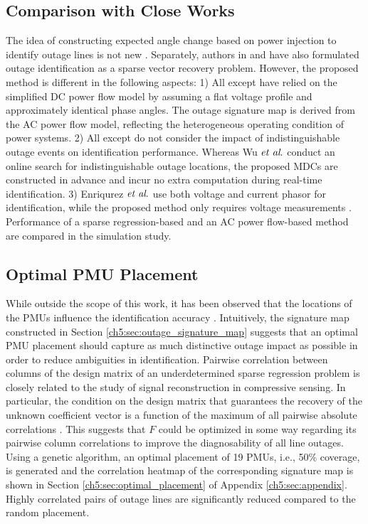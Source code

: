 \subsection{Comparison with Close Works} %
The idea of constructing expected angle change based on power injection to identify outage lines is not new \cite{Tate2008,Wu2015,Costilla-Enriquez2019}. Separately, authors in \cite{Zhu2012} and \cite{Chen2014} have also formulated outage identification as a sparse vector recovery problem. However, the proposed method is different in the following aspects: 1) All except \cite{Costilla-Enriquez2019} have relied on the simplified DC power flow model by assuming a flat voltage profile and approximately identical phase angles. The outage signature map is derived from the AC power flow model, reflecting the heterogeneous operating condition of power systems. 2) All except \cite{Wu2015} do not consider the impact of indistinguishable outage events on identification performance. Whereas Wu $\textit{et al}.$ conduct an online search for indistinguishable outage locations, the proposed MDCs are constructed in advance and incur no extra computation during real-time identification. 3) Enriqurez $\textit{et al}.$ use both voltage and current phasor for identification, while the proposed method only requires voltage measurements \cite{Costilla-Enriquez2019}. Performance of a sparse regression-based \cite{Zhu2012} and an AC power flow-based method \cite{Costilla-Enriquez2019} are compared in the simulation study.

\subsection{Optimal PMU Placement} While outside the scope of this work, it has been observed that the locations of the PMUs influence the identification accuracy \cite{yang2020optimal}. Intuitively, the signature map constructed in Section \ref{ch5:sec:outage_signature_map} suggests that an optimal PMU placement should capture as much distinctive outage impact as possible in order to reduce ambiguities in identification. Pairwise correlation between columns of the design matrix of an underdetermined sparse regression problem is closely related to the study of signal reconstruction in compressive sensing. In particular, the condition on the design matrix that guarantees the recovery of the unknown coefficient vector is a function of the maximum of all pairwise absolute correlations \cite{bastani2016compressive}. This suggests that $F$ could be optimized in some way regarding its pairwise column correlations to improve the diagnosability of all line outages. Using a genetic algorithm, an optimal placement of 19 PMUs, i.e., 50\% coverage, is generated and the correlation heatmap of the corresponding signature map is shown in Section \ref{ch5:sec:optimal_placement} of Appendix \ref{ch5:sec:appendix}. Highly correlated pairs of outage lines are significantly reduced compared to the random placement. 

